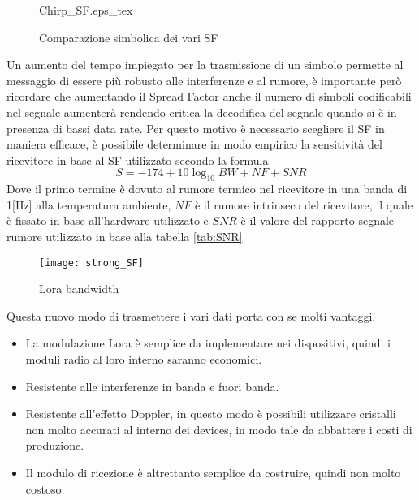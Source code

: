 \begin{figure}[h]
\centering 
{Chirp_SF.eps_tex}
\caption{Comparazione simbolica dei vari SF}
\end{figure}
Un aumento del tempo impiegato per la trasmissione di un simbolo permette al
messaggio di essere più robusto alle interferenze e al rumore, è importante però
ricordare che aumentando il Spread Factor anche il numero di simboli codificabili nel
segnale  aumenterà rendendo critica la decodifica del segnale quando si è in
presenza di bassi data rate. Per questo motivo è necessario scegliere il SF in
maniera efficace, è possibile determinare in modo empirico la sensitività del
ricevitore in base al SF utilizzato secondo la formula   
\begin{equation}
        S = -174+10\log_{10}BW + NF + SNR
\end{equation}
Dove il primo termine è dovuto al rumore termico nel ricevitore in una banda di
1[Hz] alla temperatura ambiente, $NF$ è il rumore intrinseco del ricevitore, il
quale è fissato in base all'hardware utilizzato e $SNR$ è il valore del rapporto
segnale rumore utilizzato in base alla tabella \ref{tab:SNR}

\begin{figure}[h]
        \centering 
                \texttt{[image: strong\_SF]}
        \caption{Lora bandwidth }
\end{figure}

Questa nuovo modo di trasmettere i vari dati porta con se molti vantaggi.
\begin{itemize}
\item La modulazione Lora è semplice da implementare nei dispositivi, quindi i
moduli radio al loro interno saranno economici.
\item Resistente alle interferenze in banda e fuori banda.
\item Resistente  all'effetto Doppler, in questo modo è possibili utilizzare
cristalli non molto accurati al interno dei devices, in modo tale da abbattere i
costi di produzione.
\item Il modulo di ricezione è altrettanto semplice da costruire, quindi non
molto costoso.
\end{itemize}
